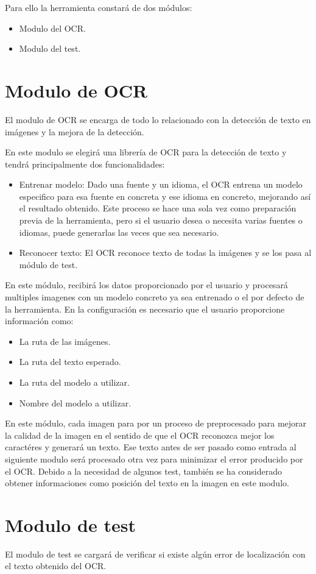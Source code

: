 Para ello la herramienta constará de dos módulos:
\begin{itemize}
	\item Modulo del OCR.
	\item Modulo del test.
\end{itemize}
\section{Modulo de OCR}
\label{sec:Modulo_OCR_Des}
El modulo de OCR se encarga de todo lo relacionado con la detección de texto en imágenes y la mejora de la detección.

En este modulo se elegirá una librería de OCR para la detección de texto y tendrá principalmente dos funcionalidades: 
\begin{itemize}
	\item Entrenar modelo: Dado una fuente y un idioma, el OCR entrena un modelo especifico para esa fuente en concreta y ese idioma en concreto, mejorando así el resultado obtenido. Este proceso se hace una sola vez como preparación previa de la herramienta, pero si el usuario desea o necesita varias fuentes o idiomas, puede generarlas las veces que sea necesario.
	\item Reconocer texto: El OCR reconoce texto de todas la imágenes y se los pasa al módulo de test. 
\end{itemize}
En este módulo, recibirá los datos proporcionado por el usuario y procesará multiples imagenes con un modelo concreto ya sea entrenado o el por defecto de la herramienta. En la configuración es necesario que el usuario proporcione información como:
\begin{itemize}
	\item La ruta de las imágenes.
	\item La ruta del texto esperado.
	\item La ruta del modelo a utilizar.
	\item Nombre del modelo a utilizar.
\end{itemize}
En este módulo, cada imagen para por un proceso de preprocesado para mejorar la calidad de la imagen en el sentido de que el OCR reconozca mejor los caractéres y generará un texto.
Ese texto antes de ser pasado como entrada al siguiente modulo será procesado otra vez para minimizar el error producido por el OCR.
Debido a la necesidad de algunos test, también se ha considerado obtener informaciones como posición del texto en la imagen en este modulo.
\section{Modulo de test}
El modulo de test se cargará de verificar si existe algún error de localización con el texto obtenido del OCR.


